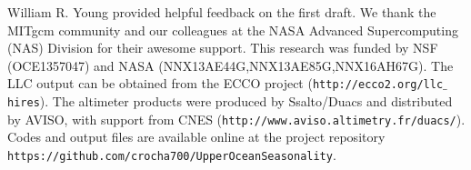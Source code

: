 \documentclass[grl]{agutex2015}
\begin{document}
\begin{article}
%
%




%

\begin{acknowledgments}
 William R. Young provided helpful feedback on the first draft. We thank the MITgcm community and our colleagues at the NASA Advanced
Supercomputing (NAS) Division for their awesome support.
This research was funded by NSF (OCE1357047) and NASA (NNX13AE44G,NNX13AE85G,NNX16AH67G).
The LLC output can be obtained from the ECCO project (\texttt{http://ecco2.org/llc$\_$hires}). The altimeter products were produced by Ssalto/Duacs
and distributed by AVISO, with support from CNES (\texttt{http://www.aviso.altimetry.fr/duacs/}).
Codes and output files are available online at the project repository
 \texttt{https://github.com/crocha700/UpperOceanSeasonality}.
\end{acknowledgments}


\end{article}
\end{document}
